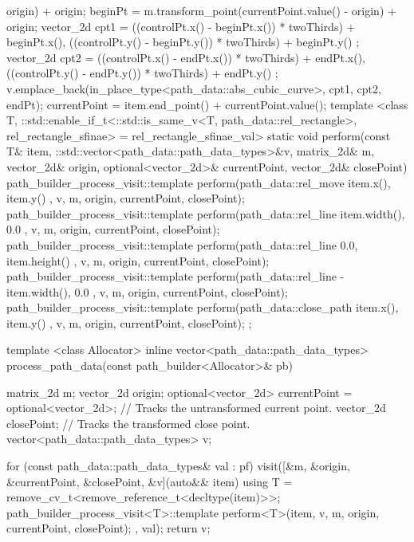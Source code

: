 \begin{codeblock}
{{{          origin) + origin;
        beginPt = m.transform_point(currentPoint.value() - origin) + origin;
        vector_2d cpt1 = { ((controlPt.x() - beginPt.x()) * twoThirds) + beginPt.x(), ((controlPt.y() - beginPt.y()) * twoThirds) + beginPt.y() };
        vector_2d cpt2 = { ((controlPt.x() - endPt.x()) * twoThirds) + endPt.x(), ((controlPt.y() - endPt.y()) * twoThirds) + endPt.y() };
        v.emplace_back(in_place_type<path_data::abs_cubic_curve>, cpt1, cpt2, endPt);
        currentPoint = item.end_point() + currentPoint.value();
      }
      template <class T, ::std::enable_if_t<::std::is_same_v<T, path_data::rel_rectangle>, rel_rectangle_sfinae> = rel_rectangle_sfinae_val>
      static void perform(const T& item, ::std::vector<path_data::path_data_types>&v, matrix_2d& m, vector_2d& origin, optional<vector_2d>& currentPoint, vector_2d& closePoint) {
        path_builder_process_visit::template perform(path_data::rel_move{ { item.x(), item.y() } }, v, m, origin, currentPoint, closePoint);
        path_builder_process_visit::template perform(path_data::rel_line{ { item.width(), 0.0 } }, v, m, origin, currentPoint, closePoint);
        path_builder_process_visit::template perform(path_data::rel_line{ { 0.0, item.height() } }, v, m, origin, currentPoint, closePoint);
        path_builder_process_visit::template perform(path_data::rel_line{ { -item.width(), 0.0 } }, v, m, origin, currentPoint, closePoint);
        path_builder_process_visit::template perform(path_data::close_path{ { item.x(), item.y() } }, v, m, origin, currentPoint, closePoint);
      }
    };
  
    template <class Allocator>
    inline vector<path_data::path_data_types> process_path_data(const path_builder<Allocator>& pb) {
      matrix_2d m;
      vector_2d origin;
      optional<vector_2d> currentPoint = optional<vector_2d>{}; // Tracks the untransformed current point.
      vector_2d closePoint;   // Tracks the transformed close point.
      vector<path_data::path_data_types> v;
  
      for (const path_data::path_data_types& val : pf) {
        visit([&m, &origin, &currentPoint, &closePoint, &v](auto&& item) {
          using T = remove_cv_t<remove_reference_t<decltype(item)>>;
          path_builder_process_visit<T>::template perform<T>(item, v, m, origin, currentPoint, closePoint);
        }, val);
      }
      return v;
    }
  }
\end{codeblock}

